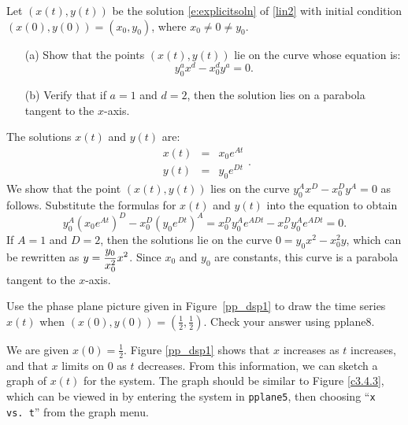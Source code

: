 \documentclass{ximera}
\begin{document}
\begin{exercise} \label{c3.4.2}
Let $(x(t),y(t))$ be the solution \eqref{e:explicitsoln} of \eqref{lin2}
with initial condition $(x(0),y(0))=(x_0,y_0)$, where $x_0\neq 0 \neq y_0$.
\begin{itemize}
\item[(a)] Show that the points $(x(t),y(t))$ lie on the curve whose 
equation is:
\[
y_0^ax^d - x_0^dy^a = 0.
\]
\item[(b)] Verify that if $a=1$ and $d=2$, then the solution lies
on a parabola tangent to the $x$-axis.
\end{itemize}

\begin{solution}

The solutions $x(t)$ and $y(t)$ are:
\[
\begin{array}{rcl}
x(t) & = & x_0e^{At} \\
y(t) & = & y_0e^{Dt}\end{array}.
\]
We show that the point $(x(t),y(t))$ lies on the curve
$y_0^Ax^D - x_0^Dy^A = 0$ as follows.  Substitute the formulas for
$x(t)$ and $y(t)$ into the equation to obtain
\[
y_0^A\left(x_0e^{At}\right)^D - x_0^D\left(y_0e^{Dt}\right)^A =
x_0^Dy_0^Ae^{ADt} - x_o^Dy_0^Ae^{ADt} = 0.
\]
If $A = 1$ and $D = 2$, then the solutions lie on the curve
$0 = y_0x^2 - x_0^2y$, which can be rewritten as
$y = \displaystyle \frac{y_0}{x_0^2}x^2$.
Since $x_0$ and $y_0$ are constants, this curve is a parabola
tangent to the $x$-axis.

\end{solution}
\end{exercise}

\begin{exercise} \label{c3.4.3}
Use the phase plane picture given in Figure~\ref{pp_dsp1} to
draw the time series $x(t)$ when $(x(0),y(0)) =
(\frac{1}{2},\frac{1}{2})$.  Check your answer using {\sf
pplane8}.

\begin{solution}

We are given $x(0) = \frac{1}{2}$.  Figure \ref{pp_dsp1}
shows that $x$ increases as $t$
increases, and that $x$ limits on $0$ as $t$ decreases.  From
this information, we can sketch a graph of $x(t)$ for the system.
The graph should be similar to Figure \ref{c3.4.3}, which can
be viewed in \Matlab by entering the system in {\tt pplane5},
then choosing ``{\tt x vs.\ t}'' from the graph menu.

\begin{figure}[htb]
                       \centerline{%
                       }
\end{figure}

\end{solution}
\end{exercise}
\end{document}
